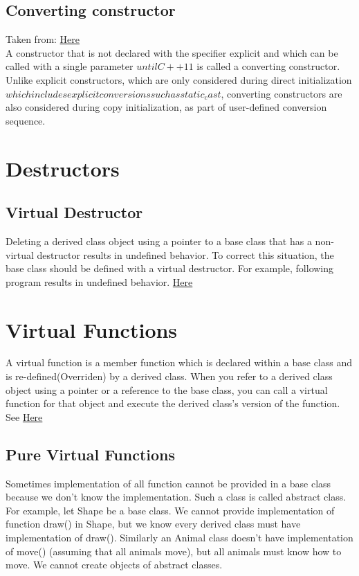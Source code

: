 \documentclass[11pt,twoside,a4paper]{report}
\begin{document}
\subsection{Converting constructor}
Taken from: \href{https://en.cppreference.com/w/cpp/language/converting_constructor}{Here} \\
A constructor that is not declared with the specifier explicit and which can be called with a single parameter \(until C++11\) is called a converting constructor.
Unlike explicit constructors, which are only considered during direct initialization \(which includes explicit conversions such as static_cast\), converting constructors are also considered during copy initialization, as part of user-defined conversion sequence. 

\section{Destructors}
\subsection{Virtual Destructor}
Deleting a derived class object using a pointer to a base class that has a non-virtual destructor results in undefined behavior. To correct this situation, the base class should be defined with a virtual destructor.
For example, following program results in undefined behavior. \href{https://www.geeksforgeeks.org/virtual-destructor/}{Here}

\section{Virtual Functions}
A virtual function is a member function which is declared within a base class and is re-defined(Overriden)
by a derived class. When you refer to a derived class object using a pointer or a reference to the base class,
you can call a virtual function for that object and execute the derived class’s version of the function.
See \href{https://www.geeksforgeeks.org/virtual-function-cpp/}{Here}

\subsection{Pure Virtual Functions}
Sometimes implementation of all function cannot be provided in a base class because we don’t know the implementation. Such a class is called abstract class. For example, let Shape be a base class. We cannot provide implementation of function draw() in Shape, but we know every derived class must have implementation of draw(). Similarly an Animal class doesn’t have implementation of move() (assuming that all animals move), but all animals must know how to move. We cannot create objects of abstract classes.
\end{document}
